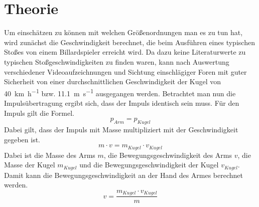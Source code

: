 \chapter{Theorie}
		Um einschätzen zu können mit welchen Größenordnungen man es zu tun hat, wird zunächst die Geschwindigkeit berechnet, die beim Ausführen eines typischen Stoßes von einem Billardspieler erreicht wird.
		Da dazu keine Literaturwerte zu typischen Stoßgeschwindigkeiten zu finden waren, kann nach Auswertung verschiedener Videoaufzeichnungen und Sichtung einschlägiger Foren mit guter Sicherheit von einer durchschnittlichen Geschwindigkeit der Kugel von \SI{40}{\kilo\metre\per\hour} bzw. \SI{11,1}{\metre\per\second} ausgegangen werden. 
		Betrachtet man nun die Impulsübertragung ergibt sich, dass der Impuls identisch sein muss. 
		Für den Impuls gilt die Formel.
		\begin{equation}
			p_{Arm} = p_{Kugel}
			\label{eq:Impuls}
		\end{equation}
		Dabei gilt, dass der Impuls mit Masse multipliziert mit der Geschwindigkeit gegeben ist.  
		\begin{equation}
			m\cdot v = m_{Kugel} \cdot v_{Kugel}%
			\label{eq:ImpulsKugel}
		\end{equation}
		Dabei ist die Masse des Arms \(m\), die Bewegungsgeschwindigkeit des Arms \(v\), die Masse der Kugel \(m_{Kugel}\) und die Bewegungsgeschwindigkeit der Kugel \(v_{Kugel}\).
		Damit kann die Bewegungsgeschwindigkeit an der Hand des Armes berechnet werden.
		\begin{equation}
			v = \frac{m_{Kugel} \cdot v_{Kugel}}{m}%
			\label{eq:SollgeschwindikeitArm}
		\end{equation}